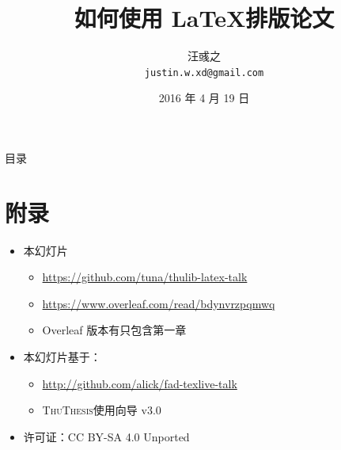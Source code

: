 \documentclass[xcolor=table,dvipsnames,svgnames]{beamer}
\title
{如何使用 \LaTeX 排版论文}
\author[汪彧之] %
{汪彧之\\ \texttt{justin.w.xd@gmail.com}}
\institute{电子工程系 博士生 \\ 清华大学 TUNA 协会}
\date[图书馆专题培训讲座] %
{2016 年 4 月 19 日}
\newcommand{\ThuThesis}{\textsc{ThuThesis}\xspace}
\begin{document}
\begin{frame}
  \titlepage
\end{frame}

\begin{frame}{目录}
  \tableofcontents
\end{frame}









\section*{附录}

\begin{frame}
  \begin{itemize}
    \item 本幻灯片
      \begin{itemize}
        \item \url{https://github.com/tuna/thulib-latex-talk}
        \item \url{https://www.overleaf.com/read/bdynvrzpqmwq}
        \item Overleaf 版本有只包含第一章
      \end{itemize}
    \item 本幻灯片基于：
      \begin{itemize}
        \item \url{http://github.com/alick/fad-texlive-talk}
        \item \ThuThesis{}使用向导 v3.0
      \end{itemize}
    \item 许可证：CC BY-SA 4.0 Unported \cc\ccby\ccsa
  \end{itemize}
\end{frame}
\end{document}
